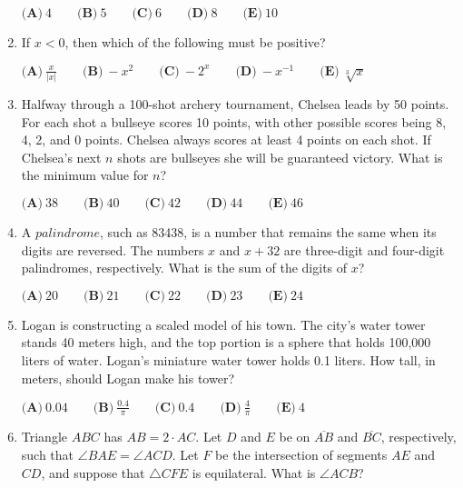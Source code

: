 \documentclass{article}
\begin{document}
\begin{enumerate}[label=\arabic*., itemsep=0.5em]
$\textbf{(A)}\ 4 \qquad \textbf{(B)}\ 5 \qquad \textbf{(C)}\ 6 \qquad \textbf{(D)}\ 8 \qquad \textbf{(E)}\ 10$\par \vspace{0.5em}\item If $x<0$, then which of the following must be positive?

$\textbf{(A)}\ \frac{x}{\left|x\right|} \qquad \textbf{(B)}\ -x^2 \qquad \textbf{(C)}\ -2^x \qquad \textbf{(D)}\ -x^{-1} \qquad \textbf{(E)}\ \sqrt[3]{x}$\par \vspace{0.5em}\item Halfway through a 100-shot archery tournament, Chelsea leads by 50 points. For each shot a bullseye scores 10 points, with other possible scores being 8, 4, 2, and 0 points. Chelsea always scores at least 4 points on each shot. If Chelsea's next $n$ shots are bullseyes she will be guaranteed victory. What is the minimum value for $n$?

$\textbf{(A)}\ 38 \qquad \textbf{(B)}\ 40 \qquad \textbf{(C)}\ 42 \qquad \textbf{(D)}\ 44 \qquad \textbf{(E)}\ 46$\par \vspace{0.5em}\item A $\textit{palindrome}$, such as 83438, is a number that remains the same when its digits are reversed. The numbers $x$ and $x+32$ are three-digit and four-digit palindromes, respectively. What is the sum of the digits of $x$?

$\textbf{(A)}\ 20 \qquad \textbf{(B)}\ 21 \qquad \textbf{(C)}\ 22 \qquad \textbf{(D)}\ 23 \qquad \textbf{(E)}\ 24$\par \vspace{0.5em}\item Logan is constructing a scaled model of his town. The city's water tower stands 40 meters high, and the top portion is a sphere that holds 100,000 liters of water. Logan's miniature water tower holds 0.1 liters. How tall, in meters, should Logan make his tower?

$\textbf{(A)}\ 0.04 \qquad \textbf{(B)}\ \frac{0.4}{\pi} \qquad \textbf{(C)}\ 0.4 \qquad \textbf{(D)}\ \frac{4}{\pi} \qquad \textbf{(E)}\ 4$\par \vspace{0.5em}\item Triangle $ABC$ has $AB=2 \cdot AC$. Let $D$ and $E$ be on $\overline{AB}$ and $\overline{BC}$, respectively, such that $\angle BAE = \angle ACD$. Let $F$ be the intersection of segments $AE$ and $CD$, and suppose that $\triangle CFE$ is equilateral. What is $\angle ACB$?


\end{enumerate}
\end{document}
